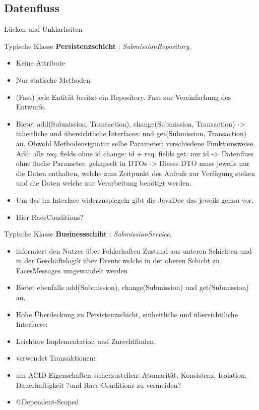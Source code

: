 \documentclass{beamer}
\begin{document}
    \subsection{Datenfluss}
    \begin{frame}{Lücken und Unklarheiten}

        Typische Klasse \textbf{Persistenzschicht} : \emph{SubmissionRepository}.
        \pause
        \begin{itemize}
            \item Keine Attribute
            \item Nur statische Methoden
            \item (Fast) jede Entität besitzt ein Repository.
            Fast zur Vereinfachung des Entwurfs.
            \item Bietet add(Submission, Transaction), change(Submission, Transaction)
            -> inheitliche und übersichtliche Interfaces:
            und get(Submission, Transaction) an.
            Obwohl Methodensignatur selbe Parameter: verschiedene Funktionsweise.
            Add: alle req. fields ohne id
            change: id + req. fields
            get: nur id
            -> Datenfluss ohne flache Parameter, gekapselt in DTOs
            -> Dieses DTO muss jeweils nur die Daten enthalten, welche zum Zeitpunkt des Aufrufs
            zur Verfügung stehen und die Daten welche zur Verarbeitung benötigt werden.
            \item Um das im Interface widerzuspiegeln gibt die JavaDoc das jeweils genau vor.
            \item Hier RaceConditions?
        \end{itemize}

        Typische Klasse \textbf{Businessschiht} : \emph{SubmissionService}.
        \pause
        \begin{itemize}
            \item informiert den Nutzer über Fehlerhaften Zustand aus unteren Schichten und in der Geschäftslogik
            über Events welche in der oberen Schicht zu FacesMessages  umgewandelt werden
            \item Bietet ebenfalls add(Submission), change(Submission)
            und get(Submission) an.
            \item Hohe Überdeckung zu Persistenzschicht, einheitliche und übersichtiliche Interfaces:
            \item Leichtere Implementation und Zurechtfinden.
            \item verwendet Transaktionen:
            \item um ACID Eigenschaften sicherzustellen: Atomarität, Konsistenz, Isolation, Dauerhaftigkeit
            ?und Race-Conditions zu vermeiden?
            \item @Dependent-Scoped
        \end{itemize}
    \end{frame}
\end{document}
